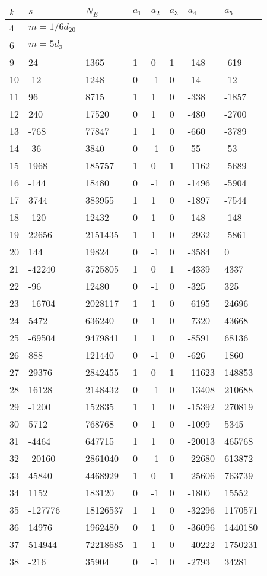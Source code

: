 \documentclass{amsart}
\begin{document}
\begin{longtable}{|l|l|l|lllll|}
\hline
$k$ & $s$ & $N_E$ & $a_1$ & $a_2$ & $a_3$ & $a_4$ & $a_5$\\
\hline
4&$m=1/6d_{20}$&&\multicolumn{5}{c|}{}\\
6&$m=5d_{3}$&&\multicolumn{5}{c|}{}\\
9&24&1365&1&0&1&-148&-619\\
10&-12&1248&0&-1&0&-14&-12\\
11&96&8715&1&1&0&-338&-1857\\
12&240&17520&0&1&0&-480&-2700\\
13&-768&77847&1&1&0&-660&-3789\\
14&-36&3840&0&-1&0&-55&-53\\
15&1968&185757&1&0&1&-1162&-5689\\
16&-144&18480&0&-1&0&-1496&-5904\\
17&3744&383955&1&1&0&-1897&-7544\\
18&-120&12432&0&1&0&-148&-148\\
19&22656&2151435&1&1&0&-2932&-5861\\
20&144&19824&0&-1&0&-3584&0\\
21&-42240&3725805&1&0&1&-4339&4337\\
22&-96&12480&0&-1&0&-325&325\\
23&-16704&2028117&1&1&0&-6195&24696\\
24&5472&636240&0&1&0&-7320&43668\\
25&-69504&9479841&1&1&0&-8591&68136\\
26&888&121440&0&-1&0&-626&1860\\
27&29376&2842455&1&0&1&-11623&148853\\
28&16128&2148432&0&-1&0&-13408&210688\\
29&-1200&152835&1&1&0&-15392&270819\\
30&5712&768768&0&1&0&-1099&5345\\
31&-4464&647715&1&1&0&-20013&465768\\
32&-20160&2861040&0&-1&0&-22680&613872\\
33&45840&4468929&1&0&1&-25606&763739\\
34&1152&183120&0&-1&0&-1800&15552\\
35&-127776&18126537&1&1&0&-32296&1170571\\
36&14976&1962480&0&1&0&-36096&1440180\\
37&514944&72218685&1&1&0&-40222&1750231\\
38&-216&35904&0&-1&0&-2793&34281\\

\end{longtable}
\end{document}
